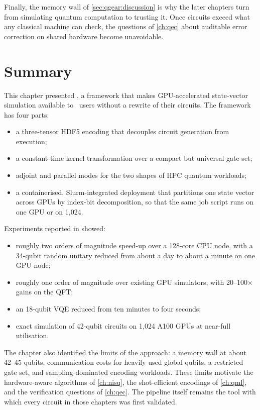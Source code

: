 Finally, the memory wall of \cref{sec:qgear:discussion} is why the later chapters turn from simulating quantum computation to trusting it. Once circuits exceed what any classical machine can check, the questions of \cref{ch:qec} about auditable error correction on shared hardware become unavoidable.

\section{Summary}\label{sec:qgear:summary}

This chapter presented \qgear, a framework that makes GPU-accelerated state-vector simulation available to \qiskit\ users without a rewrite of their circuits. The framework has four parts:
\begin{itemize}
  \item a three-tensor HDF5 encoding that decouples circuit generation from execution;
  \item a constant-time kernel transformation over a compact but universal gate set;
  \item adjoint and parallel modes for the two shapes of HPC quantum workloads;
  \item a containerised, Slurm-integrated deployment that partitions one state vector across GPUs by index-bit decomposition, so that the same job script runs on one GPU or on 1,024.
\end{itemize}
Experiments reported in \cite{guo2025qgear} showed:
\begin{itemize}
  \item roughly two orders of magnitude speed-up over a 128-core CPU node, with a 34-qubit random unitary reduced from about a day to about a minute on one GPU node;
  \item roughly one order of magnitude over existing GPU simulators, with 20--100$\times$ gains on the QFT;
  \item an 18-qubit VQE reduced from ten minutes to four seconds;
  \item exact simulation of 42-qubit circuits on 1,024 A100 GPUs at near-full utilisation.
\end{itemize}
The chapter also identified the limits of the approach: a memory wall at about 42--45 qubits, communication costs for heavily used global qubits, a restricted gate set, and sampling-dominated encoding workloads. These limits motivate the hardware-aware algorithms of \cref{ch:nisq}, the shot-efficient encodings of \cref{ch:qml}, and the verification questions of \cref{ch:qec}. The pipeline itself remains the tool with which every circuit in those chapters was first validated.
